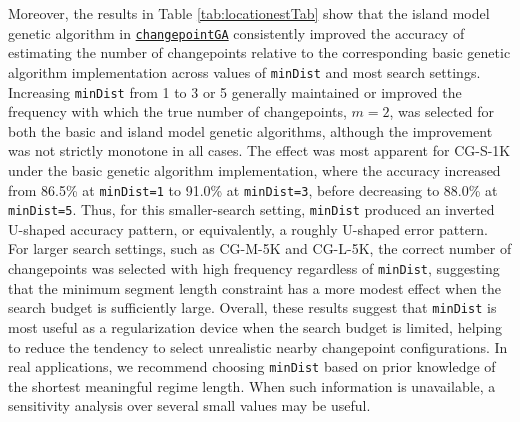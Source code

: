 Moreover, the results in Table \ref{tab:locationestTab} show that the island model genetic algorithm in \href{https://CRAN.R-project.org/package=changepointGA}{\texttt{changepointGA}} consistently improved the accuracy of estimating the number of changepoints relative to the corresponding basic genetic algorithm implementation across values of \texttt{minDist} and most search settings. Increasing \texttt{minDist} from 1 to 3 or 5 generally maintained or improved the frequency with which the true number of changepoints, \(m = 2\), was selected for both the basic and island model genetic algorithms, although the improvement was not strictly monotone in all cases. The effect was most apparent for CG-S-1K under the basic genetic algorithm implementation, where the accuracy increased from 86.5\% at \texttt{minDist=1} to 91.0\% at \texttt{minDist=3}, before decreasing to 88.0\% at \texttt{minDist=5}. Thus, for this smaller-search setting, \texttt{minDist} produced an inverted U-shaped accuracy pattern, or equivalently, a roughly U-shaped error pattern. For larger search settings, such as CG-M-5K and CG-L-5K, the correct number of changepoints was selected with high frequency regardless of \texttt{minDist}, suggesting that the minimum segment length constraint has a more modest effect when the search budget is sufficiently large. Overall, these results suggest that \texttt{minDist} is most useful as a regularization device when the search budget is limited, helping to reduce the tendency to select unrealistic nearby changepoint configurations. In real applications, we recommend choosing \texttt{minDist} based on prior knowledge of the shortest meaningful regime length. When such information is unavailable, a sensitivity analysis over several small values may be useful.

